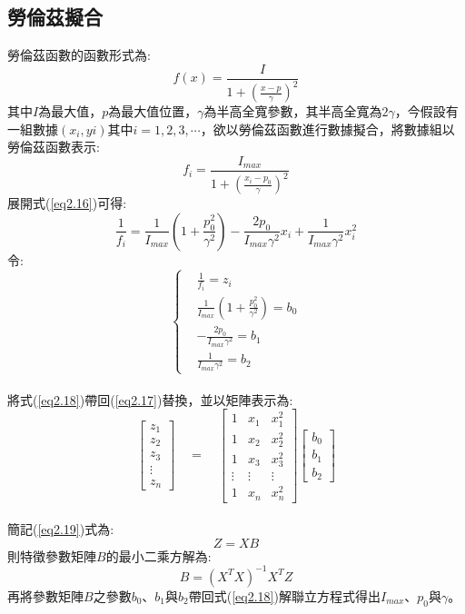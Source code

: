 \subsection{勞倫茲擬合}
勞倫茲函數\cite{Lorentz_AND_GAUSSIAN_book}的函數形式為:
\begin{equation}\label{eq2.15}
	f(x)=\frac{I}{1+(\frac{x-p}{\gamma})^2}
\end{equation}
其中$I$為最大值，$p$為最大值位置，$\gamma$為半高全寬參數，其半高全寬為$2\gamma$，今假設有一組數據$(x_i,yi)$其中$i=1,2,3,\cdots$，欲以勞倫茲函數進行數據擬合，將數據組以勞倫茲函數表示:
\begin{equation}
	f_i= \frac{I_{max}}{1+(\frac{x_i-p_{0}}{\gamma})^2}
	\label{eq2.16}
\end{equation}
展開式(\ref{eq2.16})可得:
\begin{equation}\label{eq2.17}
	\frac{1}{f_i}= \frac{1}{I_{max}}(1+\frac{p_0^2}{\gamma^2})-\frac{2p_0}{I_{max}\gamma^2}x_i+\frac{1}{I_{max}\gamma^2}x_{i}^{2}
\end{equation}
令: 
\begin{equation}\label{eq2.18}
	\begin{cases}
		& \frac{1}{f_i} = z_i \\
		& \frac{1}{I_{max}}(1+\frac{p_0^2}{\gamma^2}) = b_0\\
		& -\frac{2p_0}{I_{max}\gamma^2} = b_1\\
		&  \frac{1}{I_{max}\gamma^2} = b_2
	\end{cases}
\end{equation}\\
將式(\ref{eq2.18})帶回(\ref{eq2.17})替換，並以矩陣表示為:
\\
\begin{equation}\label{eq2.19}
	\begin{bmatrix} z_1\\z_2\\z_3\\ \vdots\\z_n\end{bmatrix} 
	\quad
	= 
	\quad
	\begin{bmatrix} 
		1&x_1&x_{1}^{2}\\
		1&x_2&x_{2}^{2}\\
		1&x_3&x_{3}^{2}\\
		\vdots&\vdots&\vdots\\
		1&x_n&x_{n}^{2}
	\end{bmatrix}
	\begin{bmatrix} b_0\\b_1\\b_2 \end{bmatrix} 
\end{equation}
\\
簡記(\ref{eq2.19})式為:
\begin{equation}\label{eq2.20}
	Z = XB
\end{equation}
則特徵參數矩陣$B$的最小二乘方解為:
\begin{equation}\label{eq2.21}
	B = (X^TX)^{-1}X^T Z
\end{equation}
再將參數矩陣$B$之參數$b_0$、$b_1$與$b_2$帶回式(\ref{eq2.18})解聯立方程式得出$I_{max}$、$p_{0}$與$\gamma$。













